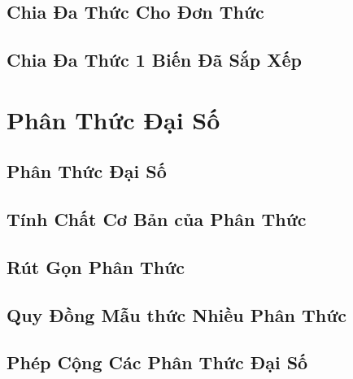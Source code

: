 \documentclass{article}
\numberwithin{equation}{section}
\begin{document}

\subsection{Chia Đa Thức Cho Đơn Thức}


\subsection{Chia Đa Thức 1 Biến Đã Sắp Xếp}


\section{Phân Thức Đại Số}

\subsection{Phân Thức Đại Số}


\subsection{Tính Chất Cơ Bản của Phân Thức}


\subsection{Rút Gọn Phân Thức}


\subsection{Quy Đồng Mẫu thức Nhiều Phân Thức}


\subsection{Phép Cộng Các Phân Thức Đại Số}
\end{document}
